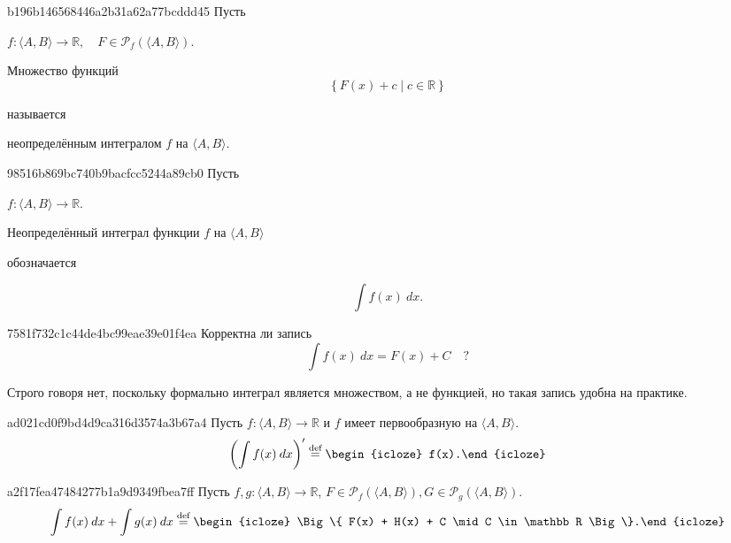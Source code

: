 \begin{note}{b196b146568446a2b31a62a77bcddd45}
    Пусть \begin{icloze}{3}\( f : \langle A, B \rangle \to \mathbb R, \quad F \in \mathscr P_f (\langle A, B \rangle) \).\end{icloze}
    \begin{icloze}{1}Множество функций
                     \[
                         \left\{ F(x) + c \mid c \in \mathbb R \right\}
                     \]\end{icloze}
    называется \begin{icloze}{2}неопределённым интегралом \( f \) на \( \langle A, B \rangle \).\end{icloze}
\end{note}

\begin{note}{98516b869bc740b9bacfcc5244a89cb0}
    Пусть \begin{icloze}{3}\( f : \langle A, B \rangle \to \mathbb R \).\end{icloze}
    \begin{icloze}{1}Неопределённый интеграл функции \( f \)  на \( \langle A, B \rangle \)\end{icloze} обозначается
    \begin{icloze}{2}
        \[
            \int f(x)\: dx.
        \]
    \end{icloze}
\end{note}

\begin{note}{7581f732c1c44de4bc99eae39e01f4ea}
    Корректна ли запись
    \[
        \int f(x)\: dx = F(x) + C \quad?
    \]

    \begin{cloze}{1}
        Строго говоря нет, поскольку формально интеграл является множеством, а не функцией, но такая запись удобна на практике.
    \end{cloze}
\end{note}

\begin{note}{ad021cd0f9bd4d9ca316d3574a3b67a4}
    Пусть \( f : \langle A, B \rangle \to \mathbb R \) и \( f \) имеет первообразную на \( \langle A, B \rangle \).
    \[
        \left( \int f(x)\: dx \right)' \overset{\text{def}}= \begin{icloze}{1}f(x).\end{icloze}
    \]
\end{note}

\begin{note}{a2f17fea47484277b1a9d9349fbea7ff}
    Пусть \( f, g : \langle A, B \rangle \to \mathbb R \), \quad \( F \in \mathscr P_f (\langle A, B \rangle), G \in \mathscr P_g (\langle A, B \rangle) \).
    \[
        \int f(x)\: dx + \int g(x)\: dx \overset{\text{def}}= \begin{icloze}{1}\Big\{ F(x) + H(x) + C \mid C \in \mathbb R \Big\}.\end{icloze}
    \]
\end{note}

